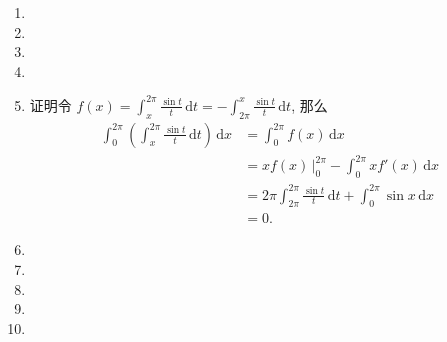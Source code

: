 \documentclass[a4paper, 11pt]{ctexart}
\newcommand{\dif}{\mathrm{d}}
\begin{document}
\begin{enumerate}
    \item %
    \item %
    \item %
    \item %
    \item %
        {\heiti 证明}\quad 令 $\displaystyle{f(x) = \int_x^{2\pi} \frac{\sin t}{t}\,\dif t = -\int_{2\pi}^x\frac{\sin t}{t}\,\dif t}$, 那么
        \begin{align*}
            \int_0^{2\pi}\left(\int_x^{2\pi}\frac{\sin t}{t}\,\dif t\right)\,\dif x &= \int_0^{2\pi} f(x)\,\dif x \\
                                                                                    &= xf(x)\,\bigg|_0^{2\pi} - \int_0^{2\pi} xf'(x)\,\dif x \\
                                                                                    &= 2\pi\int_{2\pi}^{2\pi}\frac{\sin t}{t}\,\dif t + \int_0^{2\pi}\sin x\,\dif x \\
                                                                                    &= 0.
        \end{align*}
    \item %
    \item %
    \item %
    \item %
    \item %
\end{enumerate}
\end{document}
